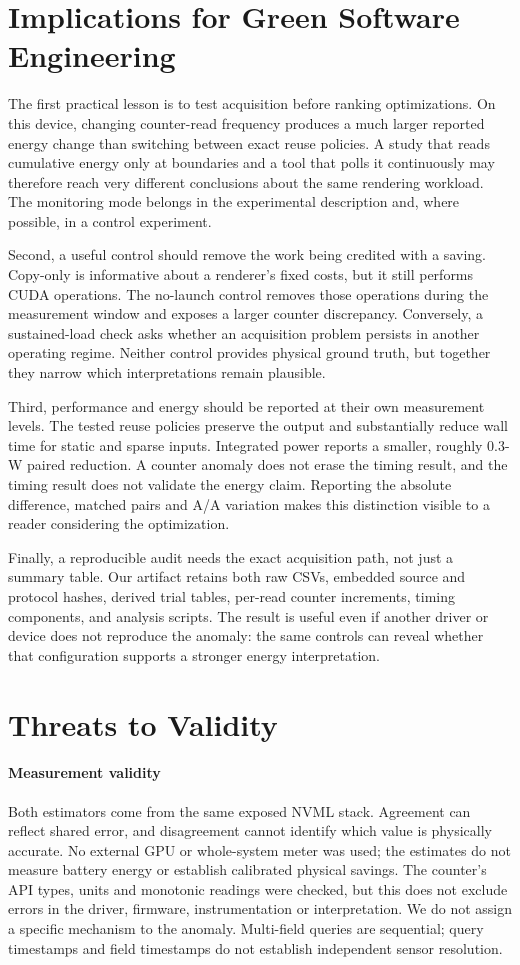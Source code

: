 \documentclass[10pt,conference]{IEEEtran}
\begin{document}
\section{Implications for Green Software Engineering}
The first practical lesson is to test acquisition before ranking optimizations. On this device, changing counter-read frequency produces a much larger reported energy change than switching between exact reuse policies. A study that reads cumulative energy only at boundaries and a tool that polls it continuously may therefore reach very different conclusions about the same rendering workload. The monitoring mode belongs in the experimental description and, where possible, in a control experiment.

Second, a useful control should remove the work being credited with a saving. Copy-only is informative about a renderer's fixed costs, but it still performs CUDA operations. The no-launch control removes those operations during the measurement window and exposes a larger counter discrepancy. Conversely, a sustained-load check asks whether an acquisition problem persists in another operating regime. Neither control provides physical ground truth, but together they narrow which interpretations remain plausible.

Third, performance and energy should be reported at their own measurement levels. The tested reuse policies preserve the output and substantially reduce wall time for static and sparse inputs. Integrated power reports a smaller, roughly 0.3-W paired reduction. A counter anomaly does not erase the timing result, and the timing result does not validate the energy claim. Reporting the absolute difference, matched pairs and A/A variation makes this distinction visible to a reader considering the optimization.

Finally, a reproducible audit needs the exact acquisition path, not just a summary table. Our artifact retains both raw CSVs, embedded source and protocol hashes, derived trial tables, per-read counter increments, timing components, and analysis scripts. The result is useful even if another driver or device does not reproduce the anomaly: the same controls can reveal whether that configuration supports a stronger energy interpretation.

\section{Threats to Validity}
\paragraph{Measurement validity}
Both estimators come from the same exposed NVML stack. Agreement can reflect shared error, and disagreement cannot identify which value is physically accurate. No external GPU or whole-system meter was used; the estimates do not measure battery energy or establish calibrated physical savings. The counter's API types, units and monotonic readings were checked, but this does not exclude errors in the driver, firmware, instrumentation or interpretation. We do not assign a specific mechanism to the anomaly. Multi-field queries are sequential; query timestamps and field timestamps do not establish independent sensor resolution.
\end{document}
